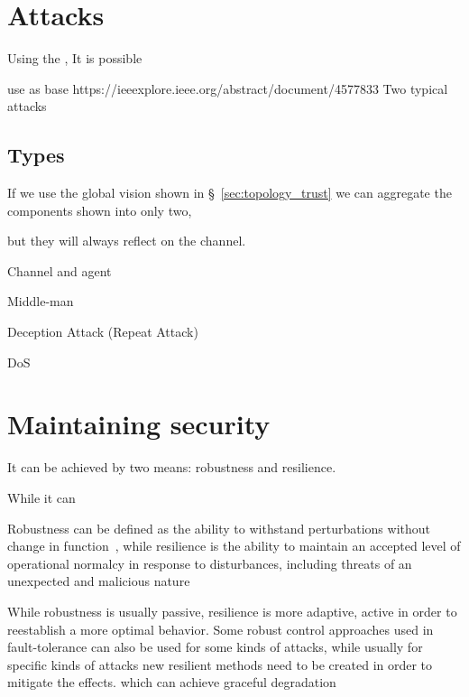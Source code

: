 \documentclass[../main.tex]{subfiles}
\begin{document}
\section{Attacks}\label{sec:attacks}
Using the \CIA{}, It is possible~\cite{TeixeiraEtAl2015}

use as base
https://ieeexplore.ieee.org/abstract/document/4577833
\cite{CaiEtAl2019,ZhangEtAl2021b}
Two typical attacks \cite{ZhangEtAl2021a}

\subsection{Types}\label{sec:types_of_attacks}
If we use the global vision shown in \S~\ref{sec:topology_trust} we can aggregate the components shown into only two,
\cite{PasqualettiEtAl2013}
\cite{BoemEtAl2020}

but they will always reflect on the channel.


Channel and agent

Middle-man

Deception Attack (Repeat Attack)

DoS

\cite{GuEtAl2016}

\section{Maintaining security}\label{sec:maintaining_security}
It can be achieved by two means: robustness and resilience.

While it can

Robustness can be defined as the ability to withstand perturbations without change in function~\cite{Jen2003}, while resilience
  is the ability to maintain an accepted level of operational normalcy  in  response  to  disturbances,  including  threats  of  an unexpected and malicious nature\cite{Rieger2010}

While robustness is usually passive, resilience is more adaptive, active in order to reestablish a more optimal behavior.
Some robust control approaches used in fault-tolerance can also be used for some kinds of attacks, while usually for specific kinds of attacks new resilient methods need to be created in order to mitigate the effects.
which can achieve graceful degradation
\end{document}
